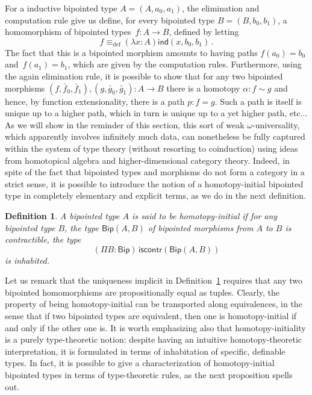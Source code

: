 \documentclass[10pt,a4paper,oneside,reqno]{amsart}
\numberwithin{equation}{section}
\theoremstyle{mythm}
\theoremstyle{mydef}
\newtheorem{definition}[theorem]{Definition}
\theoremstyle{myrmk}
\newcommand{\ie}{\text{i.e.\ }}
\newcommand{\deq}{\equiv}
\newcommand{\defeq}{\deq_{\mathrm{def}}}
\newcommand{\co}{\colon}
\newcommand{\iscontr}{\mathsf{iscontr}}
\newcommand{\ind}{\mathsf{ind}}
\newcommand{\Bip}{\mathsf{Bip}}
\newcommand{\BipHom}{\mathsf{Bip}}
\begin{document}
For a inductive bipointed type $A = (A, a_0, a_1)$, the elimination and  computation rule give us define, for every bipointed type $B = (B, b_0, b_1)$, a homomorphism of
bipointed types~$f \co A \to B$, defined by letting 
\[
f \defeq (\lambda x \co A) \ind(x, b_0, b_1) \, .
\] 
The fact that this is a bipointed morphism amounts to having  paths $f(a_0) = b_0$ and~$f(a_1) = b_1$,
which are given by the computation rules. Furthermore, using the again elimination rule, it is
possible to show that for any two bipointed morphisms $(f, \bar{f}_0, \bar{f}_1), (g, \bar{g}_0, \bar{g}_1) \co A \to B$ 
there is a homotopy $ \alpha \co f \sim g$ and hence, by function extensionality, there is a path
$p \co f = g$. Such a path is itself is unique up to a higher path, which in turn is unique up to a yet higher path, etc... As we will show in the reminder of this section, this sort of weak $\omega$-universality, which apparently involves infinitely much data, can nonetheless be fully captured within the system of type theory (without resorting to coinduction) using ideas from homotopical algebra and higher-dimensional category theory. Indeed, in spite of the fact that bipointed types and morphisms do not form a category in a strict sense, it is possible 
 to introduce the  notion of a homotopy-initial bipointed type in completely elementary and explicit terms, as we do in the next definition.


\begin{definition}\label{def:BoolInit}
A bipointed type $A$ is said to be \emph{homotopy-initial}  if for any bipointed type $B$, the type $\BipHom(A,B)$ of bipointed morphisms from $A$ to $B$
is contractible, \ie the type
\[
(\Pi B \co \Bip) \, \iscontr(\BipHom(A, B) ) 
\] 
is inhabited.
\end{definition}

Let us remark that the uniqueness implicit in Definition~\ref{def:BoolInit} requires that any two bipointed homomorphisms are propositionally equal as tuples. Clearly, the property of being  homotopy-initial  can be transported along equivalences, in the sense that if two bipointed types are equivalent, then one is homotopy-initial if and only if the other one is. It is worth emphasizing also that homotopy-initiality is a purely type-theoretic notion: despite having an intuitive homotopy-theoretic interpretation, it is formulated in terms of inhabitation of specific, definable types. In fact, it is possible to give a characterization of homotopy-initial bipointed types in terms of type-theoretic rules, as the next proposition spells out.
\end{document}
